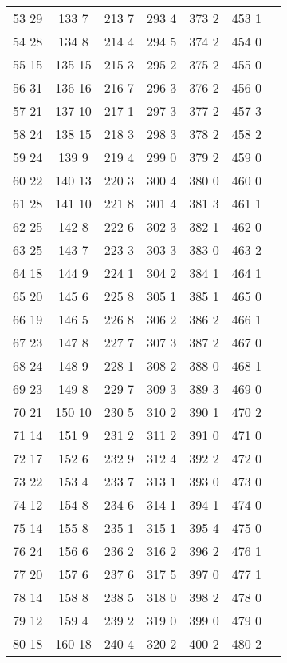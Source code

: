 \begin{table}
\begin{tabular}{c | c | c | c | c | c | c}
 53 29 & 133 7 & 213 7 & 293 4 & 373 2 & 453 1  & \\
 54 28 & 134 8 & 214 4 & 294 5 & 374 2 & 454 0  & \\
 55 15 & 135 15 & 215 3 & 295 2 & 375 2 & 455 0  & \\
 56 31 & 136 16 & 216 7 & 296 3 & 376 2 & 456 0  & \\
 57 21 & 137 10 & 217 1 & 297 3 & 377 2 & 457 3  & \\
 58 24 & 138 15 & 218 3 & 298 3 & 378 2 & 458 2  & \\
 59 24 & 139 9 & 219 4 & 299 0 & 379 2 & 459 0  & \\
 60 22 & 140 13 & 220 3 & 300 4 & 380 0 & 460 0  & \\
 61 28 & 141 10 & 221 8 & 301 4 & 381 3 & 461 1  & \\
 62 25 & 142 8 & 222 6 & 302 3 & 382 1 & 462 0  & \\
 63 25 & 143 7 & 223 3 & 303 3 & 383 0 & 463 2  & \\
 64 18 & 144 9 & 224 1 & 304 2 & 384 1 & 464 1  & \\
 65 20 & 145 6 & 225 8 & 305 1 & 385 1 & 465 0  & \\
 66 19 & 146 5 & 226 8 & 306 2 & 386 2 & 466 1  & \\
 67 23 & 147 8 & 227 7 & 307 3 & 387 2 & 467 0  & \\
 68 24 & 148 9 & 228 1 & 308 2 & 388 0 & 468 1  & \\
 69 23 & 149 8 & 229 7 & 309 3 & 389 3 & 469 0  & \\
 70 21 & 150 10 & 230 5 & 310 2 & 390 1 & 470 2  & \\
 71 14 & 151 9 & 231 2 & 311 2 & 391 0 & 471 0  & \\
 72 17 & 152 6 & 232 9 & 312 4 & 392 2 & 472 0  & \\
 73 22 & 153 4 & 233 7 & 313 1 & 393 0 & 473 0  & \\
 74 12 & 154 8 & 234 6 & 314 1 & 394 1 & 474 0  & \\
 75 14 & 155 8 & 235 1 & 315 1 & 395 4 & 475 0  & \\
 76 24 & 156 6 & 236 2 & 316 2 & 396 2 & 476 1  & \\
 77 20 & 157 6 & 237 6 & 317 5 & 397 0 & 477 1  & \\
 78 14 & 158 8 & 238 5 & 318 0 & 398 2 & 478 0  & \\
 79 12 & 159 4 & 239 2 & 319 0 & 399 0 & 479 0  & \\
 80 18 & 160 18 & 240 4 & 320 2 & 400 2 & 480 2  & \\
 \bottomrule
 \end{tabular}
 \end{table}
